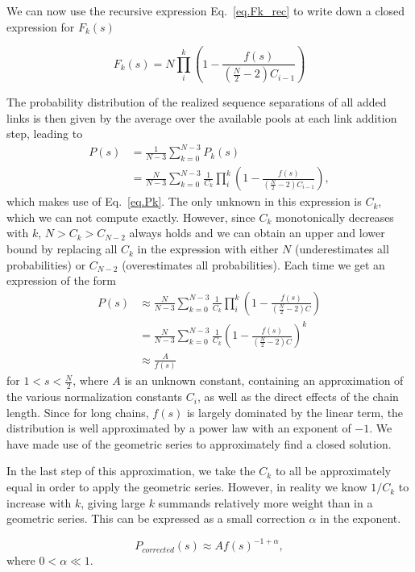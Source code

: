 \documentclass[
reprint,
twocolumn,
amsmath,amssymb,superscriptaddress,aps,
pre]{revtex4-1}
\begin{document}
We can now use the recursive expression Eq.~\ref{eq.Fk_rec} to write down a closed expression for $F_k(s)$

\begin{equation}
    F_k(s)=N\prod_{i}^k\left(1-\frac{f(s)}{(\frac{N}{2}-2)C_{i-1}} \right)
\end{equation}

The probability distribution of the realized sequence separations of all added links is then given by the average over the available pools at each link addition step, leading to
\begin{align}
    P(s)&=\frac{1}{N-3}\sum_{k=0}^{N-3} P_k(s) \nonumber \\
    &= \frac{N}{N-3}\sum_{k=0}^{N-3} \frac{1}{C_k}\prod_{i}^k\left(1-\frac{f(s)}{(\frac{N}{2}-2)C_{i-1}} \right),
\end{align}
which makes use of Eq.~\ref{eq.Pk}. The only unknown in this expression is $C_k$, which we can not compute exactly. However, since $C_k$ monotonically decreases with $k$, $N>C_k>C_{N-2}$ always holds and we can obtain an upper and lower bound by replacing all $C_k$ in the expression with either $N$ (underestimates all probabilities) or $C_{N-2}$ (overestimates all probabilities). Each time we get an expression of the form 
\begin{align}
     P(s)&\approx\frac{N}{N-3}\sum_{k=0}^{N-3} \frac{1}{C_k}\prod_{i}^k\left(1-\frac{f(s)}{(\frac{N}{2}-2)C} \right)\nonumber \\
     &=\frac{N}{N-3} \sum_{k=0}^{N-3}\frac{1}{C_k}\left(1-\frac{f(s)}{(\frac{N}{2}-2)C} \right)^k \nonumber \\
     &\approx \frac{A}{f(s)}
\end{align}
for $1<s<\frac{N}{2}$,
where $A$ is an unknown constant, containing an approximation of the various normalization constants $C_i$, as well as the direct effects of the chain length. 
Since for long chains, $f(s)$ is largely dominated by the linear term, the distribution is well approximated by a power law with an exponent of $-1$. We have made use of the geometric series to approximately find a closed solution. 

In the last step of this approximation, we take the $C_k$ to all be approximately equal in order to apply the geometric series. However, in reality we know $1/C_k$ to increase with $k$, giving large $k$ summands relatively more weight than in a geometric series. This can be expressed as a small correction $\alpha$ in the exponent.

\begin{equation}
    P_{corrected}(s)\approx A f(s)^{-1+\alpha},
\end{equation}
where $0<\alpha \ll 1$.
\end{document}
